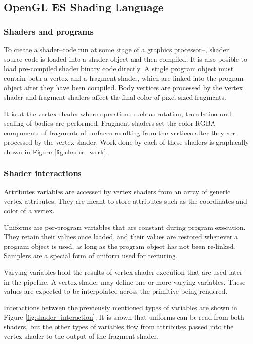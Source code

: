 \documentclass[conference]{IEEEtran}
\begin{document}
 \subsection{OpenGL ES Shading Language}
  \subsubsection{Shaders and programs}
To create a shader--code run at some stage of a graphics processor--, shader source code is loaded into a shader object and then compiled. It is also posible to load pre-compiled shader binary code directly. A single program object must contain both a vertex and a fragment shader, which are linked into the program object after they have been compiled. Body vertices are processed by the vertex shader and fragment shaders affect the final color of pixel-sized fragments. %

It is at the vertex shader where operations such as rotation, translation and scaling of bodies are performed. Fragment shaders set the color RGBA components of fragments of surfaces resulting from the vertices after they are processed by the vertex shader. Work done by each of these shaders is graphically shown in Figure \ref{fig:shader_work}. %

  \subsubsection{Shader interactions}
Attributes variables are accessed by vertex shaders from an array of generic vertex attributes. They are meant to store attributes such as the coordinates and color of a vertex. %

Uniforms are per-program variables that are constant during program execution. They retain their values once loaded, and their values are restored whenever a program object is used, as long as the program object has not been re-linked. Samplers are a special form of uniform used for texturing. %

Varying variables hold the results of vertex shader execution that are used later in the pipeline. A vertex shader may define one or more varying variables. These values are expected to be interpolated across the primitive being rendered. %

Interactions between the previously mentioned types of variables are shown in Figure \ref{fig:shader_interaction}. It is shown that uniforms can be read from both shaders, but the other types of variables flow from attributes passed into the vertex shader to the output of the fragment shader. %
\end{document}
